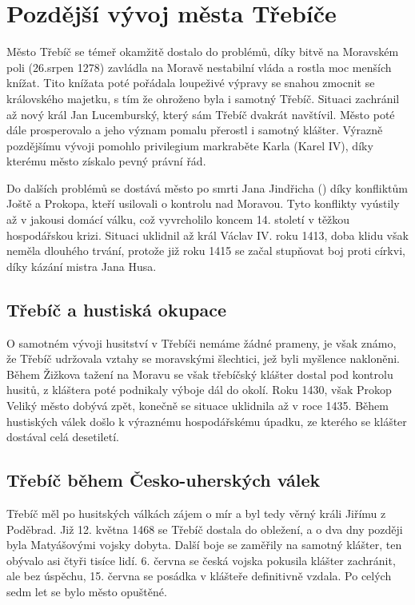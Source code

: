 \documentclass[a4paper,oneside,12p]{report}
\begin{document}
\chapter{Pozdější vývoj města Třebíče}

Město Třebíč se témeř okamžitě dostalo do problémů, díky bitvě na Moravském poli (26.srpen 1278) zavládla na Moravě nestabilní vláda a rostla moc menších knížat.
Tito knížata poté pořádala loupeživé výpravy se snahou zmocnit se královského majetku, s tím že ohroženo byla i samotný Třebíč. %
Situaci zachránil až nový král Jan Lucemburský, který sám Třebíč dvakrát navštívil.
Město poté dále prosperovalo a jeho význam pomalu přerostl i samotný klášter.
Výrazně pozdějšímu vývoji pomohlo privilegium markraběte Karla (Karel IV), díky kterému město získalo pevný právní řád.

Do dalších problémů se dostává město po smrti Jana Jindřicha () díky konfliktům Joště a Prokopa, kteří usilovali o kontrolu nad Moravou.
Tyto konflikty vyústily až v jakousi domácí válku, což vyvrcholilo koncem 14. století v těžkou hospodářskou krizi.
Situaci uklidnil až král Václav IV. roku 1413, doba klidu však neměla dlouhého trvání, protože již roku 1415 se začal stupňovat boj proti církvi, díky kázání mistra Jana Husa. %

\section{Třebíč a hustiská okupace}

O samotném vývoji husitství v Třebíči nemáme žádné prameny, je však známo, že Třebíč udržovala vztahy se moravskými šlechtici, jež byli myšlence nakloněni.
Během Žižkova tažení na Moravu se však třebíčský klášter dostal pod kontrolu husitů, z kláštera poté podnikaly výboje dál do okolí.
Roku 1430, však Prokop Veliký město dobývá zpět, konečně se situace uklidnila až v roce 1435.
Během hustiských válek došlo k výraznému hospodářskému úpadku, ze kterého se klášter dostával celá desetiletí. %

\section{Třebíč během Česko-uherských válek}

Třebíč měl po husitských válkách zájem o mír a byl tedy věrný králi Jiřímu z Poděbrad.
Již 12. května 1468 se Třebíč dostala do obležení, a o dva dny později byla Matyášovými vojsky dobyta.
Další boje se zaměřily na samotný klášter, ten obývalo asi čtyři tisíce lidí.
6. června se česká vojska pokusila klášter zachránit, ale bez úspěchu, 15. června se posádka v klášteře definitivně vzdala.
Po celých sedm let se bylo město opuštěné. %
\end{document}
